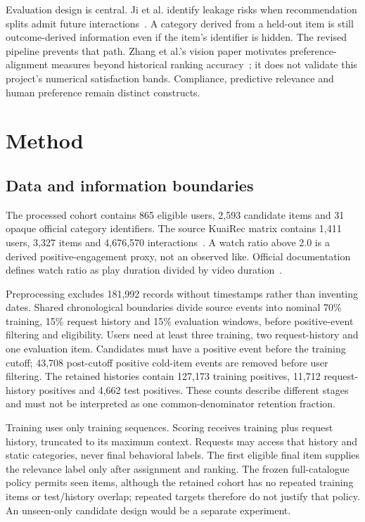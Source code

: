 \documentclass[conference]{IEEEtran}
\begin{document}
Evaluation design is central. Ji et al. identify leakage risks when recommendation splits admit future interactions~\cite{ji2023leakage}. A category derived from a held-out item is still outcome-derived information even if the item's identifier is hidden. The revised pipeline prevents that path. Zhang et al.'s vision paper motivates preference-alignment measures beyond historical ranking accuracy~\cite{zhang2026context}; it does not validate this project's numerical satisfaction bands. Compliance, predictive relevance and human preference remain distinct constructs.

\section{Method}
\subsection{Data and information boundaries}
The processed cohort contains 865 eligible users, 2,593 candidate items and 31 opaque official category identifiers. The source KuaiRec matrix contains 1,411 users, 3,327 items and 4,676,570 interactions~\cite{gao2022kuairec}. A watch ratio above 2.0 is a derived positive-engagement proxy, not an observed like. Official documentation defines watch ratio as play duration divided by video duration~\cite{kuairecdocs}.

Preprocessing excludes 181,992 records without timestamps rather than inventing dates. Shared chronological boundaries divide source events into nominal 70\% training, 15\% request history and 15\% evaluation windows, before positive-event filtering and eligibility. Users need at least three training, two request-history and one evaluation item. Candidates must have a positive event before the training cutoff; 43,708 post-cutoff positive cold-item events are removed before user filtering. The retained histories contain 127,173 training positives, 11,712 request-history positives and 4,662 test positives. These counts describe different stages and must not be interpreted as one common-denominator retention fraction.

Training uses only training sequences. Scoring receives training plus request history, truncated to its maximum context. Requests may access that history and static categories, never final behavioral labels. The first eligible final item supplies the relevance label only after assignment and ranking. The frozen full-catalogue policy permits seen items, although the retained cohort has no repeated training items or test/history overlap; repeated targets therefore do not justify that policy. An unseen-only candidate design would be a separate experiment.
\end{document}
